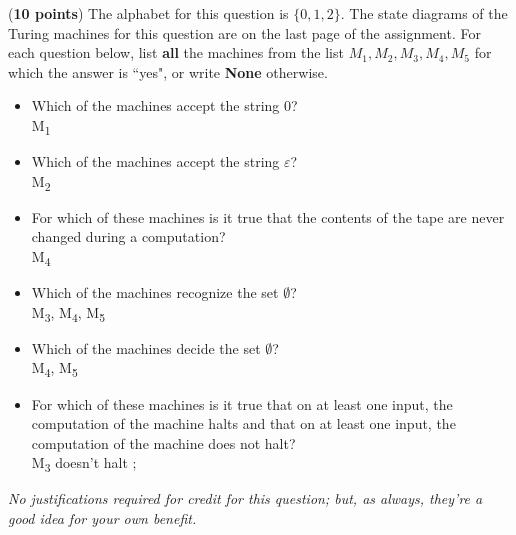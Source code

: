 \documentclass[10pt,letterpaper,unboxed,cm]{hmcpset}
\begin{document}
\begin{problem}[1.]({\bf 10 points}) The alphabet for this question is $\{0,1,2\}$. The state diagrams of the Turing machines for this question are on the last page
of the assignment. For each question below, list {\bf all} the machines from the list $M_1, M_2, 
M_3, M_4, M_5$ for which the answer is ``yes", or write {\bf None} otherwise.
\begin{itemize}
\item[a.] Which of the machines accept the string $0$? \\
	M\textsubscript{1}
\item[b.] Which of the machines accept the string $\varepsilon$? \\
	M\textsubscript{2}
\item[c.] For which of these machines is it true that the contents of the tape are never changed during a computation? \\
	M\textsubscript{4}
\item[d.] Which of the machines recognize the set $\emptyset$? \\
M\textsubscript{3}, M\textsubscript{4}, M\textsubscript{5}
\item[e.] Which of the machines decide the set $\emptyset$? \\
M\textsubscript{4}, M\textsubscript{5}
\item[f.] For which of these machines is it true that on at least one input, the computation of the machine halts
and that on at least one input, the computation of the machine does not halt? \\
 M\textsubscript{3} doesn't halt ;
 
\end{itemize}



{\it No justifications required for credit for this question; but, as always, they're a good idea for your own benefit.}
\end{problem}
\end{document}
